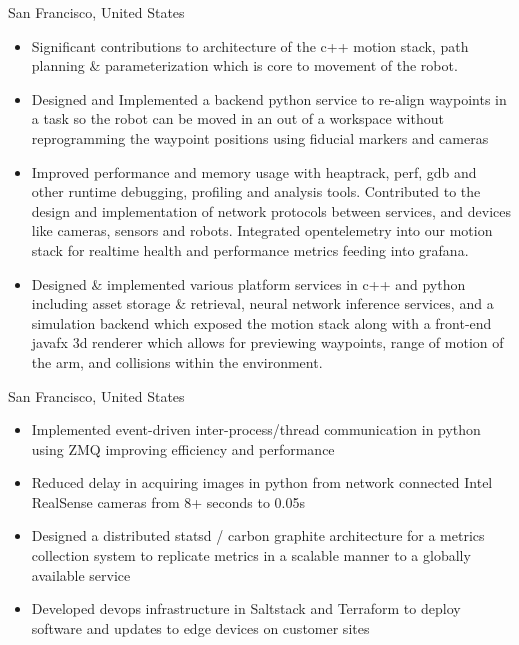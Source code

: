 \documentclass[10pt,a4paper,ragged2e,withhyper]{altacv}
\begin{document}
\begin{paracol}{2}


 {San Francisco, United States}
\begin{itemize}
\item Significant contributions to architecture of the c++ motion stack, path planning \& parameterization which is core to movement of the robot. 
\item Designed and Implemented a backend python service to re-align waypoints in a task so the robot can be moved in an out of a workspace without reprogramming the waypoint positions using fiducial markers and cameras
\item Improved performance and memory usage with heaptrack, perf, gdb and other runtime debugging, profiling and analysis tools. Contributed to the design and implementation of network protocols between services, and devices like cameras, sensors and robots. Integrated opentelemetry into our motion stack for realtime health and performance metrics feeding into grafana.
\item Designed \& implemented various platform services in c++ and python including asset storage \& retrieval, neural network inference services, and a simulation backend which exposed the motion stack along with a front-end javafx 3d renderer which allows for previewing waypoints, range of motion of the arm, and  collisions within the environment.
\end{itemize}

 {San Francisco, United States}
\begin{itemize}
\item Implemented event-driven inter-process/thread communication in python using ZMQ improving efficiency and performance
\item Reduced delay in acquiring images in python from network connected Intel RealSense cameras from 8+ seconds to 0.05s
\item Designed a distributed statsd / carbon graphite architecture for a metrics collection system to replicate metrics in a scalable manner to a globally available service
\item Developed devops infrastructure in Saltstack and Terraform to deploy software and updates to edge devices on customer sites
\end{itemize}


\end{paracol}
\end{document}

